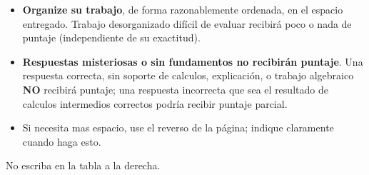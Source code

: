 \documentclass[11pt]{exam}
\begin{document}
\begin{minipage}[t]{3.7in}
\vspace{0pt}
\begin{itemize}

\item \textbf{Organize su trabajo}, de forma razonablemente ordenada, en el espacio entregado. Trabajo desorganizado dif\'icil de evaluar recibir\'a poco o nada de puntaje (independiente de su exactitud). 

\item \textbf{Respuestas misteriosas o sin fundamentos no recibir\'an puntaje}.  Una respuesta correcta, sin soporte de calculos, explicaci\'on, o trabajo algebraico \textbf{NO} recibir\'a puntaje; una respuesta incorrecta que sea el resultado de calculos intermedios correctos podr\'ia recibir puntaje parcial.

\item Si necesita mas espacio, use el reverso de la p\'agina; indique claramente cuando haga esto.
\end{itemize}

No escriba en la tabla a la derecha.
\end{minipage}
\hfill
\begin{minipage}[t]{2.3in}
\vspace{0pt}
\addpoints %
\gradetable[v]%

\end{minipage}
\newpage %
\end{document}
